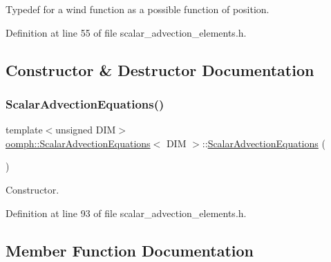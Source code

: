 Typedef for a wind function as a possible function of position. 



Definition at line 55 of file scalar\+\_\+advection\+\_\+elements.\+h.



\subsection{Constructor \& Destructor Documentation}
\mbox{\label{classoomph_1_1ScalarAdvectionEquations_aeea281c0a811e20894953ceb6fae4b2a}} 
\subsubsection{\texorpdfstring{Scalar\+Advection\+Equations()}{ScalarAdvectionEquations()}}
{\footnotesize\ttfamily template$<$unsigned D\+IM$>$ \\
\hyperlink{classoomph_1_1ScalarAdvectionEquations}{oomph\+::\+Scalar\+Advection\+Equations}$<$ D\+IM $>$\+::\hyperlink{classoomph_1_1ScalarAdvectionEquations}{Scalar\+Advection\+Equations} (\begin{DoxyParamCaption}{ }\end{DoxyParamCaption})\hspace{0.3cm}{\ttfamily [inline]}}



Constructor. 



Definition at line 93 of file scalar\+\_\+advection\+\_\+elements.\+h.



\subsection{Member Function Documentation}
\mbox{\label{classoomph_1_1ScalarAdvectionEquations_ae94eb3569c9fd7f9e07defb77006cd63}} 
